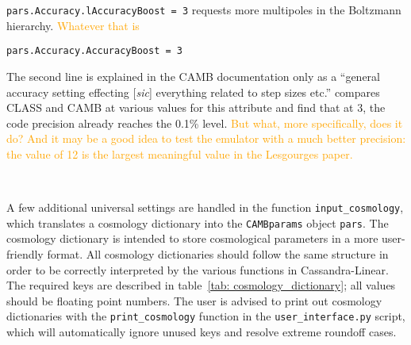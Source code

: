 \verb|pars.Accuracy.lAccuracyBoost = 3| \quad requests more multipoles in the Boltzmann hierarchy. \textcolor{orange}{Whatever that is}

\verb|pars.Accuracy.AccuracyBoost = 3| 

The second line is explained in the CAMB documentation only as a ``general 
accuracy setting effecting [\textit{sic}] everything related to step sizes 
etc.'' \citet{Lesgourges} compares CLASS and CAMB at various values for this
attribute and find that at 3, the code precision already reaches the 0.1\% 
level. \textcolor{orange}{But what, more specifically, does it do? And it may
be a good idea to test the emulator with a much better precision: the value of
12 is the largest meaningful value in the Lesgourges paper.}

\

A few additional universal settings are handled in the function
\verb|input_cosmology|, which translates a cosmology dictionary into 
the \verb|CAMBparams| object \verb|pars|. The cosmology dictionary is
intended to store cosmological parameters in a more user-friendly format.
All cosmology dictionaries should follow the same structure in order to be 
correctly interpreted by the various functions in Cassandra-Linear. The required keys are described in table~\ref{tab: cosmology_dictionary}; all
values should be floating point numbers. The user is advised to print out
cosmology dictionaries with the \verb|print_cosmology| function in the
\verb|user_interface.py| script, which will automatically ignore unused keys
and resolve extreme roundoff cases.


